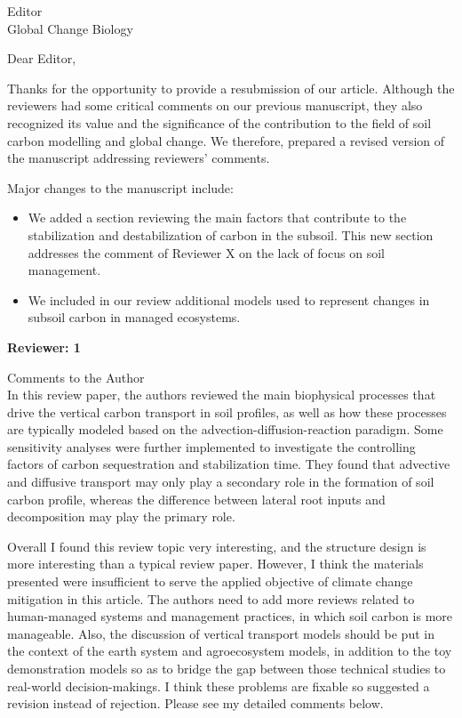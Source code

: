 \documentclass[11pt]{bgcletter}
\begin{document}
\begin{letter}{Editor\\
   Global Change Biology
}
\opening{Dear Editor,}
Thanks for the opportunity to provide a resubmission of our article. Although the reviewers had some critical comments on our previous manuscript, they also recognized its value and the significance of the contribution to the field of soil carbon modelling and global change. We therefore, prepared a revised version of the manuscript addressing reviewers' comments. 

Major changes to the manuscript include: 
\begin{itemize}
\item We added a section reviewing the main factors that contribute to the stabilization and destabilization of carbon in the subsoil. This new section addresses the comment of Reviewer X on the lack of focus on soil management.
\item We included in our review additional models used to represent changes in subsoil carbon in managed ecosystems.
\end{itemize}

\textbf{Reviewer: 1}

Comments to the Author \\
In this review paper, the authors reviewed the main biophysical processes that drive the vertical carbon transport in soil profiles, as well as how these processes are typically modeled based on the advection-diffusion-reaction paradigm. Some sensitivity analyses were further implemented to investigate the controlling factors of carbon sequestration and stabilization time. They found that advective and diffusive transport may only play a secondary role in the formation of soil carbon profile, whereas the difference between lateral root inputs and decomposition may play the primary role.

Overall I found this review topic very interesting, and the structure design is more interesting than a typical review paper. However, I think the materials presented were insufficient to serve the applied objective of climate change mitigation in this article. The authors need to add more reviews related to human-managed systems and management practices, in which soil carbon is more manageable. Also, the discussion of vertical transport models should be put in the context of the earth system and agroecosystem models, in addition to the toy demonstration models so as to bridge the gap between those technical studies to real-world decision-makings. I think these problems are fixable so suggested a revision instead of rejection. Please see my detailed comments below.


\end{letter}
\end{document}
